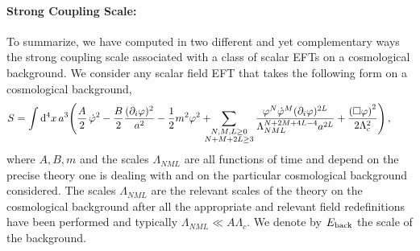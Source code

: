 \documentclass[12pt]{article}
\def\ba{\begin{eqnarray}}
\def\ea{\end{eqnarray}}
\def\d{\mathrm{d}}
\def\p{\partial}
\def\p{\partial}
\begin{document}
\paragraph{Strong Coupling Scale:} To summarize, we have computed in two different and yet complementary ways the strong coupling scale associated with a class of scalar EFTs on a cosmological background. We consider any scalar field EFT that takes the following form on a cosmological background,
\ba
S=\int \d^4 x \, a^3 \Bigg(\frac A2\, \dot \varphi^2 - \frac{B}{2}\frac{(\p_i \varphi)^2}{a^2} -\frac 12 m^2 \varphi^2
+\hspace{-3mm}\sum_{\substack{N,M,L\ge 0 \\ N+M+2L\ge 3 }}\frac{\varphi^N \dot \varphi^M (\p_i \varphi)^{2L}}{\Lambda_{NML}^{N+2M+4L-4} a^{2L} }  +\frac{\left(  \Box \varphi  \right)^2}{2\Lambda_c^2}
\Bigg)\,,\qquad
\ea
where $A,B,m$ and the scales $\Lambda_{NML}$ are all functions of time and depend on the precise theory one is dealing with and on the particular cosmological background considered. The scales $\Lambda_{NML}$ are the relevant scales of the theory on the cosmological background after all the appropriate and relevant field redefinitions have been performed and typically $\Lambda_{NML}\ll A \Lambda_c$. We denote by $E_{\rm back}$ the scale of the background. \\
\end{document}
